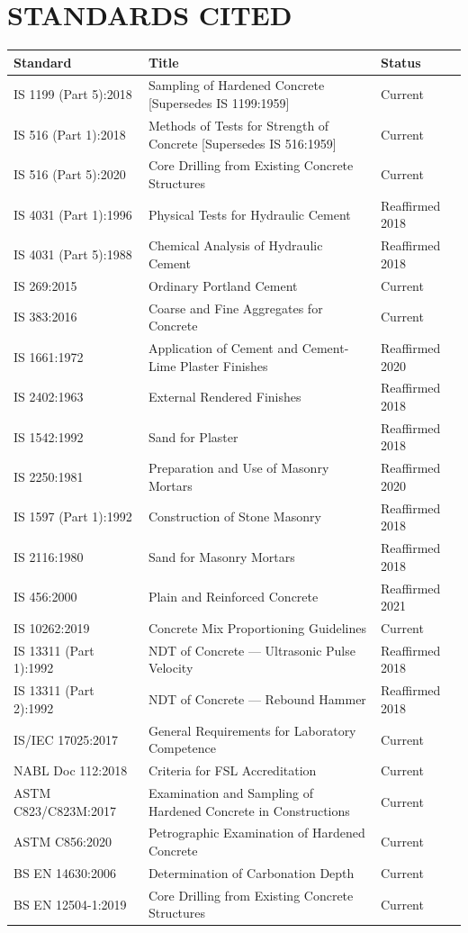\documentclass[12pt, a4paper]{article}
\begin{document}
\section{STANDARDS CITED}

\begin{longtable}{|l|p{}|p{}|}
\hline
\textbf{Standard} & \textbf{Title} & \textbf{Status} \\
\hline\endhead
IS 1199 (Part 5):2018 & Sampling of Hardened Concrete [Supersedes IS 1199:1959] & Current \\
IS 516 (Part 1):2018 & Methods of Tests for Strength of Concrete [Supersedes IS 516:1959] & Current \\
IS 516 (Part 5):2020 & Core Drilling from Existing Concrete Structures & Current \\
IS 4031 (Part 1):1996 & Physical Tests for Hydraulic Cement & Reaffirmed 2018 \\
IS 4031 (Part 5):1988 & Chemical Analysis of Hydraulic Cement & Reaffirmed 2018 \\
IS 269:2015 & Ordinary Portland Cement & Current \\
IS 383:2016 & Coarse and Fine Aggregates for Concrete & Current \\
IS 1661:1972 & Application of Cement and Cement-Lime Plaster Finishes & Reaffirmed 2020 \\
IS 2402:1963 & External Rendered Finishes & Reaffirmed 2018 \\
IS 1542:1992 & Sand for Plaster & Reaffirmed 2018 \\
IS 2250:1981 & Preparation and Use of Masonry Mortars & Reaffirmed 2020 \\
IS 1597 (Part 1):1992 & Construction of Stone Masonry & Reaffirmed 2018 \\
IS 2116:1980 & Sand for Masonry Mortars & Reaffirmed 2018 \\
IS 456:2000 & Plain and Reinforced Concrete & Reaffirmed 2021 \\
IS 10262:2019 & Concrete Mix Proportioning Guidelines & Current \\
IS 13311 (Part 1):1992 & NDT of Concrete --- Ultrasonic Pulse Velocity & Reaffirmed 2018 \\
IS 13311 (Part 2):1992 & NDT of Concrete --- Rebound Hammer & Reaffirmed 2018 \\
IS/IEC 17025:2017 & General Requirements for Laboratory Competence & Current \\
NABL Doc 112:2018 & Criteria for FSL Accreditation & Current \\
ASTM C823/C823M:2017 & Examination and Sampling of Hardened Concrete in Constructions & Current \\
ASTM C856:2020 & Petrographic Examination of Hardened Concrete & Current \\
BS EN 14630:2006 & Determination of Carbonation Depth & Current \\
BS EN 12504-1:2019 & Core Drilling from Existing Concrete Structures & Current \\
\hline
\end{longtable}
\end{document}
